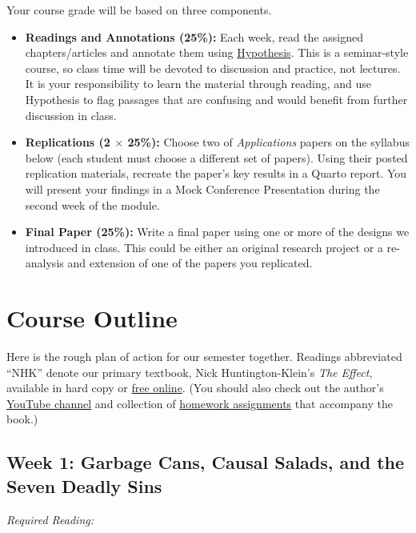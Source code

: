 \documentclass[11pt, letterpaper]{article}
\begin{document}
Your course grade will be based on three components.

\begin{itemize}
	\item \textbf{Readings and Annotations (25\%):} Each week, read the assigned chapters/articles and annotate them using \href{https://hypothes.is/groups/Qm2VnAae/causal-inference}{Hypothesis}. This is a seminar-style course, so class time will be devoted to discussion and practice, not lectures. It is your responsibility to learn the material through reading, and use Hypothesis to flag passages that are confusing and would benefit from further discussion in class.
	\item \textbf{Replications (2 $\times$ 25\%):} Choose two of \textit{Applications} papers on the syllabus below (each student must choose a different set of papers). Using their posted replication materials, recreate the paper's key results in a Quarto report. You will present your findings in a Mock Conference Presentation during the second week of the module.
	\item \textbf{Final Paper (25\%):} Write a final paper using one or more of the designs we introduced in class. This could be either an original research project or a re-analysis and extension of one of the papers you replicated.
\end{itemize}


\section*{Course Outline}

Here is the rough plan of action for our semester together. Readings abbreviated ``NHK'' denote our primary textbook, Nick Huntington-Klein's \textit{The Effect}, available in hard copy or \href{https://theeffectbook.net/}{free online}. (You should also check out the author's \href{https://www.youtube.com/playlist?list=PLcTBLulJV_AK1hKtnO0-kYrU0D09K-kj8}{YouTube channel} and collection of \href{https://github.com/NickCH-K/TheEffectAssignments}{homework assignments} that accompany the book.)

\subsection*{Week 1: Garbage Cans, Causal Salads, and the Seven Deadly Sins}

\textit{Required Reading:}
\end{document}

